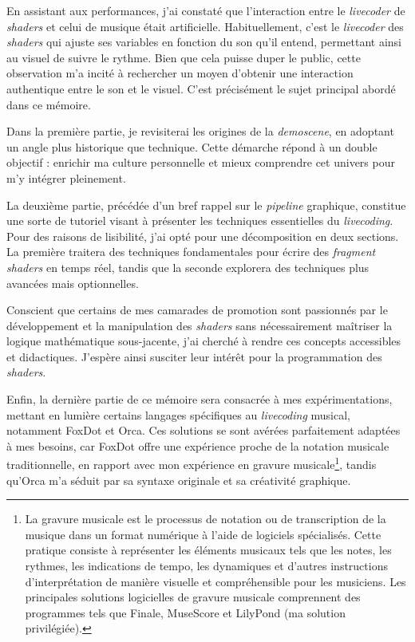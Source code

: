 En assistant aux performances, j'ai constaté que l'interaction entre le \textit{livecoder} de \textit{shaders} et celui de musique était artificielle. Habituellement, c'est le \textit{livecoder} des \textit{shaders} qui ajuste ses variables en fonction du son qu'il entend, permettant ainsi au visuel de suivre le rythme. Bien que cela puisse duper le public, cette observation m'a incité à rechercher un moyen d'obtenir une interaction authentique entre le son et le visuel. C'est précisément le sujet principal abordé dans ce mémoire.

Dans la première partie, je revisiterai les origines de la \textit{demoscene}, en adoptant un angle plus historique que technique. Cette démarche répond à un double objectif : enrichir ma culture personnelle et mieux comprendre cet univers pour m'y intégrer pleinement. 

La deuxième partie, précédée d'un bref rappel sur le \textit{pipeline} graphique, constitue une sorte de tutoriel visant à présenter les techniques essentielles du \textit{livecoding}. Pour des raisons de lisibilité, j'ai opté pour une décomposition en deux sections. La première traitera des techniques fondamentales pour écrire des \textit{fragment shaders} en temps réel, tandis que la seconde explorera des techniques plus avancées mais optionnelles.

Conscient que certains de mes camarades de promotion sont passionnés par le développement et la manipulation des \textit{shaders} sans nécessairement maîtriser la logique mathématique sous-jacente, j'ai cherché à rendre ces concepts accessibles et didactiques. J'espère ainsi susciter leur intérêt pour la programmation des \textit{shaders}.

Enfin, la dernière partie de ce mémoire sera consacrée à mes expérimentations, mettant en lumière certains langages spécifiques au \textit{livecoding} musical, notamment FoxDot et Orca. Ces solutions se sont avérées parfaitement adaptées à mes besoins, car FoxDot offre une expérience proche de la notation musicale traditionnelle, en rapport avec mon expérience en gravure musicale\footnote{La gravure musicale est le processus de notation ou de transcription de la musique dans un format numérique à l'aide de logiciels spécialisés. Cette pratique consiste à représenter les éléments musicaux tels que les notes, les rythmes, les indications de tempo, les dynamiques et d'autres instructions d'interprétation de manière visuelle et compréhensible pour les musiciens. Les principales solutions logicielles de gravure musicale comprennent des programmes tels que Finale, MuseScore et LilyPond (ma solution privilégiée).}, tandis qu'Orca m'a séduit par sa syntaxe originale et sa créativité graphique.

